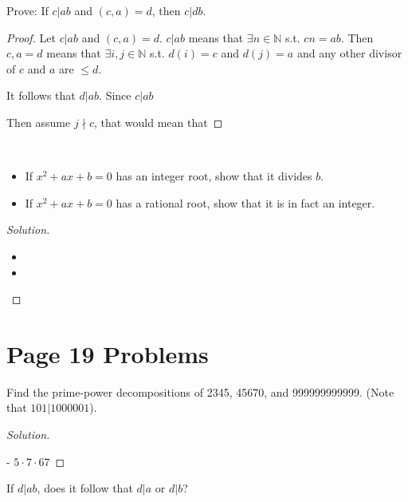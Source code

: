\documentclass[11pt]{article}
\newcommand{\N}{\mathbb{N}}
\newenvironment{problem}[2][Problem]{\begin{trivlist}
\item[\hskip \labelsep {\bfseries #1}\hskip \labelsep {\bfseries #2.}]}{\end{trivlist}}
\newenvironment{solution}
  {\renewcommand\qedsymbol{$~$}\begin{proof}[Solution]$ $\par\nobreak\ignorespaces}
  {\end{proof}}
\begin{document}
\begin{problem}{14}
Prove: If $c|ab$ and $(c,a)=d$, then $c|db$.
\end{problem}

\begin{proof}
  Let $c|ab$ and $(c,a)=d$. $c|ab$ means that $\exists n\in\N$ s.t. $cn=ab$. Then ${c,a}=d$ means that $\exists i,j\in\N$ s.t. $d(i)=c$ and $d(j)=a$ and any other divisor of $c$ and $a$ are $\leq d$.

  It follows that $d|ab$. Since $c|ab$

  Then assume $j\nmid c$, that would mean that



\end{proof}



\begin{problem}{15} ~\\
\begin{itemize}
  \item [(a)] If $x^2+ax+b=0$ has an integer root, show that it divides $b$.
  \item [(b)] If $x^2+ax+b=0$ has a rational root, show that it is in fact an integer.
\end{itemize}
\end{problem}

\begin{solution}
  \begin{itemize}
    \item [(a)]
    \item [(b)]
  \end{itemize}
\end{solution}



\section{Page 19 Problems}



\begin{problem}{2}
Find the prime-power decompositions of 2345, 45670, and 999999999999. (Note that $101|1000001$).
\end{problem}

\begin{solution}
  2345 - $5 \cdot 7 \cdot 67$
\end{solution}



\begin{problem}{8}
If $d|ab$, does it follow that $d|a$ or $d|b$?
\end{problem}
\end{document}
